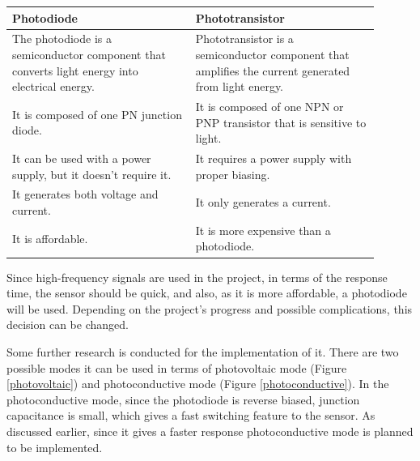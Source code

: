 \documentclass[a4paper,10pt]{IEEEtran}
\begin{document}
\begin{table}[htbp!]
    \begin{tabular}{|p{0.45\linewidth}|p{0.45\linewidth}|}
    \hline
    \textbf{Photodiode}                                                         & \textbf{Phototransistor}                                                                \\ \hline
    The photodiode is a semiconductor component that converts light energy into electrical energy. & Phototransistor is a semiconductor component that amplifies the current generated from light energy. \\ \hline
    It is composed of one PN junction diode.                                                   & It is composed of one NPN or PNP transistor that is sensitive to light.                                \\ \hline
    It can be used with a power supply, but it doesn't require it.                              & It requires a   power supply with proper biasing.                                                        \\ \hline
    It generates both voltage and current.                                                     & It only generates a current.                                                                             \\ \hline
    It is affordable.                                                                            & It is more expensive than a photodiode.                                                                  \\ \hline
    \end{tabular}
    \label{table1}
\end{table}




Since high-frequency signals are used in the project, in terms of the response time, the sensor should be quick, and also, as it is more affordable, a photodiode will be used. Depending on the project's progress and possible complications, this decision can be changed. 

Some further research is conducted for the implementation of it. There are two possible modes it can be used in terms of photovoltaic mode (Figure \ref{photovoltaic}) and photoconductive mode (Figure \ref{photoconductive}). In the photoconductive mode, since the photodiode is reverse biased, junction capacitance is small, which gives a fast switching feature to the sensor. As discussed earlier, since it gives a faster response photoconductive mode is planned to be implemented.
\end{document}
